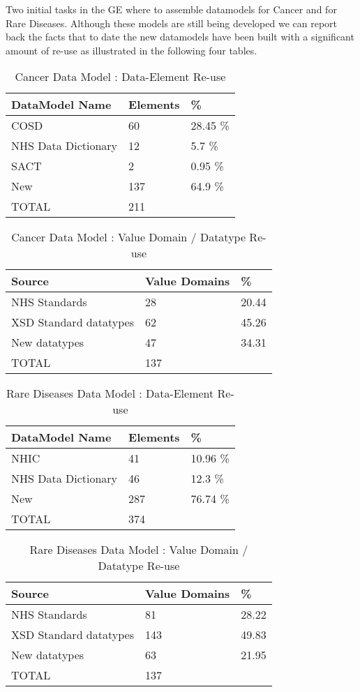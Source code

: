 Two initial tasks in the GE where to assemble datamodels for Cancer and for Rare Diseases. Although these models are still being developed we can report back the facts that to date the new datamodels have been built with a significant amount of re-use as illustrated in the following four tables.

\begin{table}[h]
	\caption{Cancer Data Model : Data-Element Re-use}
	\begin{tabular}{ p{2.8cm} p{1.8cm}  p{1.8cm}   }  %
		\hline
		DataModel Name &  Elements & \%  \\ 
		\hline
		COSD & 60 & 28.45 \% \\
		NHS Data Dictionary & 12 & 5.7 \% \\
		SACT & 2 & 0.95 \% \\
		New & 137 & 64.9 \% \\
		\hline
		TOTAL & 211
	\end{tabular}
\end{table}

\begin{table}[h]
		\caption{Cancer Data Model : Value Domain / Datatype Re-use}
	\begin{tabular}{p{2.8cm} p{1.8cm}  p{1.8cm}     }  %
		\hline
		Source & Value Domains& \%  \\ 
		\hline
		NHS Standards & 28 & 20.44\\
		XSD Standard datatypes & 62 & 45.26 \\
		New datatypes & 47 & 34.31 \\
		\hline
		TOTAL & 137
	\end{tabular}
\end{table}

\begin{table}[h]
	\caption{Rare Diseases Data Model : Data-Element Re-use}
	\begin{tabular}{ p{2.8cm} p{1.8cm}  p{1.8cm}   }  %
		\hline
		DataModel Name &  Elements & \%  \\ 
		\hline
		NHIC & 41 & 10.96 \% \\
		NHS Data Dictionary & 46 & 12.3 \% \\
		New & 287 & 76.74 \% \\
		\hline
		TOTAL & 374
	\end{tabular}
\end{table}

\begin{table}[h]
	\caption{Rare Diseases Data Model : Value Domain / Datatype Re-use}
	\begin{tabular}{ p{2.8cm} p{1.8cm}  p{1.8cm}      }  %
		\hline
		Source & Value Domains& \%  \\ 
		\hline
		NHS Standards & 81 & 28.22\\
		XSD Standard datatypes & 143 & 49.83 \\
		New datatypes & 63 & 21.95 \\
		\hline
		TOTAL & 137
	\end{tabular}
\end{table}

